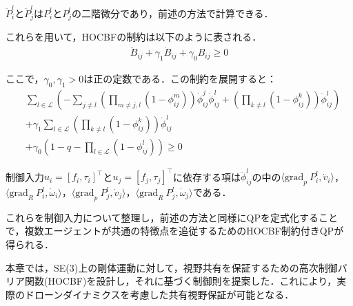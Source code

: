 $\ddot{P}_i^l$と$\ddot{P}_j^l$は$P_i^l$と$P_j^l$の二階微分であり，前述の方法で計算できる．

これらを用いて，HOCBFの制約は以下のように表される．
\begin{equation}
\begin{aligned}
\ddot{B}_{ij} + \gamma_1 \dot{B}_{ij} + \gamma_0 B_{ij} \geq 0
\label{eq:hocbf_constraint_edge}
\end{aligned}
\end{equation}

ここで，$\gamma_0, \gamma_1 > 0$は正の定数である．この制約を展開すると：
\begin{equation}
\begin{aligned}
&\sum_{l \in \mathcal{L}} \left( -\sum_{j \neq l} \left( \prod_{m \neq j, l} (1 - \phi_{ij}^m) \right) \dot{\phi}_{ij}^j \dot{\phi}^l_{ij} + \left( \prod_{k \neq l} (1 - \phi_{ij}^k) \right) \ddot{\phi}^l_{ij} \right) \\
&+ \gamma_1 \sum_{l \in \mathcal{L}} \left( \prod_{k \neq l} (1 - \phi_{ij}^k) \right) \dot{\phi}^l_{ij} \\
&+ \gamma_0 (1 - q - \prod_{l \in \mathcal{L}} (1 - \phi_{ij}^l)) \geq 0
\label{eq:hocbf_constraint_edge_expanded}
\end{aligned}
\end{equation}

制御入力$u_i = [f_i, \tau_i]^\top$と$u_j = [f_j, \tau_j]^\top$に依存する項は$\ddot{\phi}^l_{ij}$の中の$\langle \mathrm{grad}_p\:P_i^l, \dot{v}_i \rangle$，$\langle \mathrm{grad}_R\:P_i^l, \dot{\omega}_i \rangle$，$\langle \mathrm{grad}_p\:P_j^l, \dot{v}_j \rangle$，$\langle \mathrm{grad}_R\:P_j^l, \dot{\omega}_j \rangle$である．

これらを制御入力について整理し，前述の方法と同様にQPを定式化することで，複数エージェントが共通の特徴点を追従するためのHOCBF制約付きQPが得られる．

本章では，SE(3)上の剛体運動に対して，視野共有を保証するための高次制御バリア関数(HOCBF)を設計し，それに基づく制御則を提案した．これにより，実際のドローンダイナミクスを考慮した共有視野保証が可能となる．
